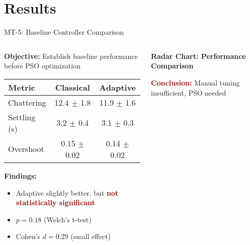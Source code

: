 \documentclass[10pt,aspectratio=169]{beamer}
\newcommand{\emphred}[1]{\textcolor{darkred}{\textbf{#1}}}
\begin{document}
\section{Results}

\begin{frame}{MT-5: Baseline Controller Comparison}
\begin{columns}
\begin{column}{0.5\textwidth}
\textbf{Objective:} Establish baseline performance before PSO optimization

\vspace{0.3cm}
\begin{table}
\tiny
\begin{tabular}{lcc}
\toprule
\textbf{Metric} & \textbf{Classical} & \textbf{Adaptive} \\
\midrule
Chattering & 12.4 $\pm$ 1.8 & 11.9 $\pm$ 1.6 \\
Settling (s) & 3.2 $\pm$ 0.4 & 3.1 $\pm$ 0.3 \\
Overshoot & 0.15 $\pm$ 0.02 & 0.14 $\pm$ 0.02 \\
\bottomrule
\end{tabular}
\end{table}

\vspace{0.3cm}
\textbf{Findings:}
\begin{itemize}
    \item Adaptive slightly better, but \emphred{not statistically significant}
    \item $p = 0.18$ (Welch's t-test)
    \item Cohen's $d = 0.29$ (small effect)
\end{itemize}
\end{column}
\begin{column}{0.5\textwidth}
\begin{center}
\textbf{Radar Chart: Performance Comparison}
\end{center}

\vspace{0.2cm}
\centering
\emphred{Conclusion:} Manual tuning insufficient, PSO needed
\end{column}
\end{columns}
\end{frame}
\end{document}
